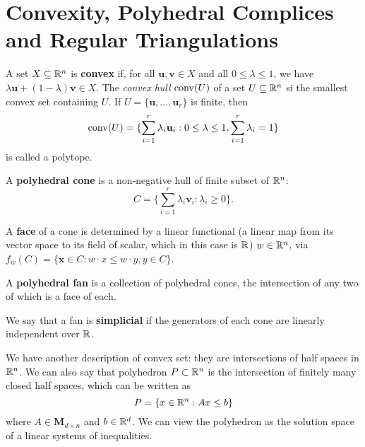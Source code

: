 \section{Convexity, Polyhedral Complices and Regular Triangulations} 
\label{sec:convexity-polyhedral-complices-and-regular-triangulations}

	\begin{definition}[Convexity]
		A set $X \subseteq \mathbb{R}^n$ is \textbf{convex} if,
		for all $\mathbf{u}, \mathbf{v} \in X$
		and all $0 \le \lambda \le 1$,
		we have $\lambda \mathbf{u} + (1 - \lambda)\mathbf{v} \in X$.
		The \emph{convex hull} $\operatorname{conv}(U)$ of a set  
		$U \subseteq \mathbb{R}^n$ si the smallest convex set containing $U$.
		 If $U = \{\mathbf{u}, \ldots, \mathbf{u}_r\}$ is finite,
		 then 
		 \[
		 \operatorname{conv}(U) = \{\sum\limits_{i = 1}^r \lambda_i \mathbf{u}_i: 0 \le \lambda \le 1, \sum\limits_{i = 1}^{r} \lambda_i = 1\}
		 \]
		 is called a polytope. 
	\end{definition}
	
	\begin{definition}
		A \textbf{polyhedral cone} is a non-negative hull of 
		finite subset of $\mathbb{R}^n$:
		\[
		C = \{\sum\limits_{i = 1}^r \lambda_i \mathbf{v}_i: \lambda_i \ge 0\}.
		\]
	\end{definition}
	
	\begin{definition}
		A \textbf{face} of a cone is determined by a linear functional 
		(a linear map from its vector space to its field of scalar,
		which in this case is $\mathbb{R}$)
		$w \in \mathbb{R}^n$, via 
		$f_w(C) = \{\mathbf{x} \in C: w \cdot x \le w \cdot y, y \in C \}$.
	\end{definition}
	
	\begin{definition}
		A \textbf{polyhedral fan} is a collection of polyhedral cones,
		the intersection of any two of which is a face of each.
	\end{definition}
	
	\begin{definition}
	    We say that a fan is \textbf{simplicial} 
	    if the generators of each cone are linearly independent over $\mathbb{R}$.
	\end{definition}
	
	\begin{remark}
	We have another description of convex set: 
	they are intersections of half spaces in $\mathbb{R}^n$.
	We can also say that polyhedron $P \subset \mathbb{R}^n$ 
	is the intersection of finitely many closed half spaces,
	which can be written as 
	\[
	P = \{x \in \mathbb{R}^n: Ax \le b \}
	\] 
	where $A \in \mathbf{M}_{d \times n}$ and $b \in \mathbb{R}^d$.
	We can view the polyhedron as the solution space 
	of a linear systems of inequalities. 
	\end{remark}
	
